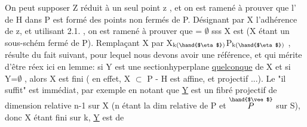 On peut supposer Z réduit à un seul point z , et on est ramené à
prouver que l' de H dans P est formé  des points non fermés de P.
Désignant par X l'adhérence de z, et utilisant 2.1. , on est ramené à
prouver que \hand{$_\eta$} = $\emptyset$ sss X est   (X étant un sous-schém%
fermé  de P). Remplaçant X par X$_{\text{k(\hand{$\eta$})}}$\hand{$\hookrightarrow$}P$_{\text{k(\hand{$\eta$})}}$ ,   résulte du fait
\margin{$|$}suivant, pour lequel nous devons avoir une référence, et qui mérite d'être
réex ici en lemme: si Y est une sectionhyperplane \uline{quelconque} de
X et si Y\hand{$_\eta$}=$\emptyset$ , alors X est fini ( en effet, X $\subset$ P - H est affine, et
projectif ...). Le "il suffit" est immédiat, par exemple en notant que
\uline{Y} est un fibré projectif de dimension relative n-1 sur X (n étant la
dim relative de P  et $\overset{\hand{$\vee$}}{P}$ sur S), donc X étant fini sur k, \uline{Y} est de

